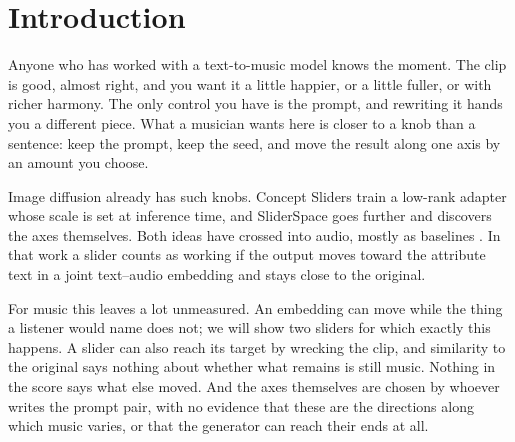 \section{Introduction}

Anyone who has worked with a text-to-music model knows the moment. The clip is good, almost right, and you want it a little happier, or a little fuller, or with richer harmony. The only control you have is the prompt, and rewriting it hands you a different piece. What a musician wants here is closer to a knob than a sentence: keep the prompt, keep the seed, and move the result along one axis by an amount you choose.

Image diffusion already has such knobs. Concept Sliders \citep{gandikota2024sliders} train a low-rank adapter whose scale is set at inference time, and SliderSpace \citep{gandikota2025sliderspace} goes further and discovers the axes themselves. Both ideas have crossed into audio, mostly as baselines \citep{ezra2025freesliders,staniszewski2026tada}. In that work a slider counts as working if the output moves toward the attribute text in a joint text--audio embedding and stays close to the original.

For music this leaves a lot unmeasured. An embedding can move while the thing a listener would name does not; we will show two sliders for which exactly this happens. A slider can also reach its target by wrecking the clip, and similarity to the original says nothing about whether what remains is still music. Nothing in the score says what else moved. And the axes themselves are chosen by whoever writes the prompt pair, with no evidence that these are the directions along which music varies, or that the generator can reach their ends at all.

